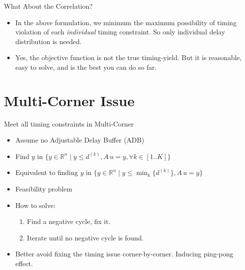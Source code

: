 \documentclass[
  ignorenonframetext,
]{beamer}
\providecommand{\tightlist}{%
  \setlength{\itemsep}{0pt}\setlength{\parskip}{0pt}}
\begin{document}
\begin{frame}{What About the Correlation?}
\protect\hypertarget{what-about-the-correlation}{}
\begin{itemize}
\tightlist
\item
  In the above formulation, we minimum the maximum possibility of timing
  violation of each \emph{individual} timing constraint. So only
  individual delay distribution is needed.
\item
  Yes, the objective function is not the true timing-yield. But it is
  reasonable, easy to solve, and is the best you can do so far.
\end{itemize}
\end{frame}

\hypertarget{multi-corner-issue}{%
\section{Multi-Corner Issue}\label{multi-corner-issue}}

\begin{frame}{Meet all timing constraints in Multi-Corner}
\protect\hypertarget{meet-all-timing-constraints-in-multi-corner}{}
\begin{itemize}
\tightlist
\item
  Assume no Adjustable Delay Buffer (ADB)
\item
  Find \(y\) in
  \(\{y \in \mathbb{R}^n \mid y \leq d^{(k)}, A\,u = y, \forall k\in[1..K]\}\)
\item
  Equivalent to finding \(y\) in
  \(\{y \in \mathbb{R}^n \mid y \leq \min_k\{ d^{(k)}\}, A\,u = y \}\)
\item
  Feasibility problem
\item
  How to solve:

  \begin{enumerate}
  \tightlist
  \item
    Find a negative cycle, fix it.
  \item
    Iterate until no negative cycle is found.
  \end{enumerate}
\item
  Better avoid fixing the timing issue corner-by-corner. Inducing
  ping-pong effect.
\end{itemize}
\end{frame}
\end{document}
